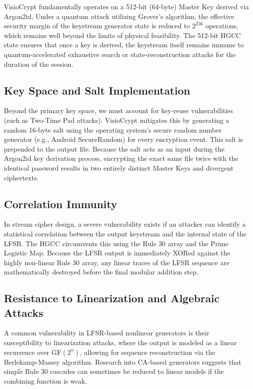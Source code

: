 \documentclass[runningheads]{llncs}
\begin{document}
VisioCrypt fundamentally operates on a 512-bit (64-byte) Master Key derived via Argon2id. Under a quantum attack utilizing Grover's algorithm, the effective security margin of the keystream generator state is reduced to $2^{256}$ operations, which remains well beyond the limits of physical feasibility. The 512-bit HGCC state ensures that once a key is derived, the keystream itself remains immune to quantum-accelerated exhaustive search or state-reconstruction attacks for the duration of the session.

\subsection{Key Space and Salt Implementation}
Beyond the primary key space, we must account for key-reuse vulnerabilities (such as Two-Time Pad attacks). VisioCrypt mitigates this by generating a random 16-byte salt using the operating system's secure random number generator (e.g., Android SecureRandom) for every encryption event. This salt is prepended to the output file. Because the salt acts as an input during the Argon2id key derivation process, encrypting the exact same file twice with the identical password results in two entirely distinct Master Keys and divergent ciphertexts.

\subsection{Correlation Immunity}
In stream cipher design, a severe vulnerability exists if an attacker can identify a statistical correlation between the output keystream and the internal state of the LFSR. The HGCC circumvents this using the Rule 30 array and the Prime Logistic Map. Because the LFSR output is immediately XORed against the highly non-linear Rule 30 array, any linear traces of the LFSR sequence are mathematically destroyed before the final modular addition step.

\subsection{Resistance to Linearization and Algebraic Attacks}
A common vulnerability in LFSR-based nonlinear generators is their susceptibility to linearization attacks, where the output is modeled as a linear recurrence over $\text{GF}(2^n)$, allowing for sequence reconstruction via the Berlekamp-Massey algorithm. Research into CA-based generators \cite{settle2010} suggests that simple Rule 30 cascades can sometimes be reduced to linear models if the combining function is weak.
\end{document}
